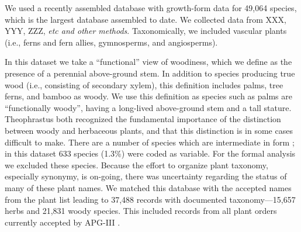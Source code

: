 \documentclass[12pt]{article}
\begin{document}



We used a recently assembled database with growth-form data for
49,064 species, which is the largest database assembled to date.
%
% 
We collected data from XXX, YYY, ZZZ, \textit{etc and other methods}.
Taxonomically, we included vascular plants (i.e., ferns and fern
allies, gymnosperms, and angiosperms).

In this dataset we take a ``functional'' view of woodiness, which we
define as the presence of a perennial above-ground stem.  In addition
to species producing true wood (i.e., consisting of secondary xylem),
this definition includes palms, tree ferns, and bamboo as woody.
%
We use this definition as species such as palms are ``functionally
woody'', having a long-lived above-ground stem and a tall stature.
%
Theophrastus both recognized the fundamental importance of the
distinction between woody and herbaceous plants, and that this
distinction is in some cases difficult to make.  There are a number of
species which are intermediate in form \citep{beaulieuHiddenRates}; in
this dataset 633 species (1.3\%) were coded as variable.  For the
formal analysis we excluded these species. Because the effort to
organize plant taxonomy, especially synonymy, is on-going, there was
uncertainty regarding the status of many of these plant names.  We
matched this database with the accepted names from the plant list
\citep{ThePlantList} leading to 37,488 records with documented
taxonomy---15,657 herbs and 21,831 woody species.  This included
records from all plant orders currently accepted by APG-III
\citep{APG3}.
\end{document}
